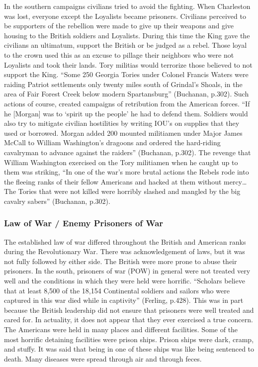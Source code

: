 In the southern campaigns civilians tried to avoid the fighting. When Charleston
was lost, everyone except the Loyalists became prisoners.  Civilians perceived
to be supporters of the rebellion were made to give up their weapons and give
housing to the British soldiers and Loyalists.  During this time the King gave
the civilians an ultimatum, support the British or be judged as a rebel. Those
loyal to the crown used this as an excuse to pillage their neighbors who were
not Loyalists and took their lands. Tory militias would terrorize those believed
to not support the King.  “Some 250 Georgia Tories under Colonel Francis Waters
were raiding Patriot settlements only twenty miles south of Grindal’s Shoals, in
the area of Fair Forest Creek below modern Spartansburg” (Buchanan, p.302).
Such actions of course, created campaigns of retribution from the American
forces.  “If he [Morgan] was to ‘spirit up the people’ he had to defend them.
Soldiers would also try to mitigate civilian hostilities by writing IOU’s on
supplies that they used or borrowed. Morgan added 200 mounted militiamen under
Major James McCall to William Washington’s dragoons and ordered the hard-riding
cavalryman to advance against the raiders” (Buchanan, p.302).  The revenge that
William Washington exercised on the Tory militiamen when he caught up to them
was striking, “In one of the war’s more brutal actions the Rebels rode into the
fleeing ranks of their fellow Americans and hacked at them without mercy…The
Tories that were not killed were horribly slashed and mangled by the big cavalry
sabers” (Buchanan, p.302).  

\subsubsection{Law of War / Enemy Prisoners of War}

The established law of war differed throughout the British and American ranks
during the Revolutionary War. There was acknowledgement of laws, but it was not
fully followed by either side. The British were more prone to abuse their
prisoners. In the south, prisoners of war (POW) in general were not treated very
well and the conditions in which they were held were horrific. “Scholars believe
that at least 8,500 of the 18,154 Continental soldiers and sailors who were
captured in this war died while in captivity” (Ferling, p.428).  This was in
part because the British leadership did not ensure that prisoners were well
treated and cared for.  In actuality, it does not appear that they ever
exercised a true concern. The Americans were held in many places and different
facilities. Some of the most horrific detaining facilities were prison ships.
Prison ships were dark, cramp, and stuffy.  It was said that being in one of
these ships was like being sentenced to death.  Many diseases were spread
through air and through feces. 

